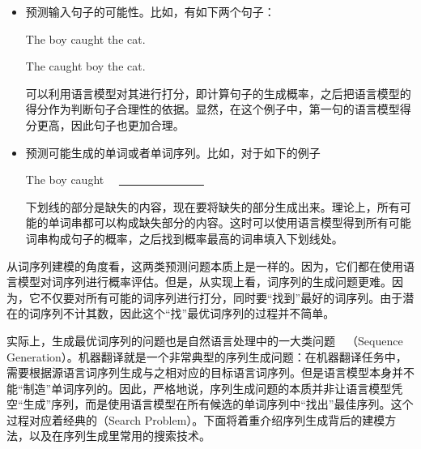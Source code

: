 \begin{itemize}
\vspace{0.5em}
\item 预测输入句子的可能性。比如，有如下两个句子：

\vspace{0.8em}
\hspace{10em} The boy caught the cat.

\vspace{0.8em}
\hspace{10em} The caught boy the cat.

\vspace{0.8em}

\noindent 可以利用语言模型对其进行打分，即计算句子的生成概率，之后把语言模型的得分作为判断句子合理性的依据。显然，在这个例子中，第一句的语言模型得分更高，因此句子也更加合理。

\vspace{0.5em}
\item 预测可能生成的单词或者单词序列。比如，对于如下的例子

\vspace{0.8em}
\hspace{10em} The boy caught \ \ \underline{\ \ \ \ \ \ \ \ \ \ \ \ \ \ \ }
\vspace{0.8em}

\noindent 下划线的部分是缺失的内容，现在要将缺失的部分生成出来。理论上，所有可能的单词串都可以构成缺失部分的内容。这时可以使用语言模型得到所有可能词串构成句子的概率，之后找到概率最高的词串填入下划线处。

\vspace{0.5em}
\end{itemize}

\parinterval 从词序列建模的角度看，这两类预测问题本质上是一样的。因为，它们都在使用语言模型对词序列进行概率评估。但是，从实现上看，词序列的生成问题更难。因为，它不仅要对所有可能的词序列进行打分，同时要“找到”最好的词序列。由于潜在的词序列不计其数，因此这个“找”最优词序列的过程并不简单。

\parinterval 实际上，生成最优词序列的问题也是自然语言处理中的一大类问题\ \dash\ {\small{}}（Sequence Generation）。机器翻译就是一个非常典型的序列生成问题：在机器翻译任务中，需要根据源语言词序列生成与之相对应的目标语言词序列。但是语言模型本身并不能“制造”单词序列的。因此，严格地说，序列生成问题的本质并非让语言模型凭空“生成”序列，而是使用语言模型在所有候选的单词序列中“找出”最佳序列。这个过程对应着经典的{\small{}}（Search Problem）。下面将着重介绍序列生成背后的建模方法，以及在序列生成里常用的搜索技术。

